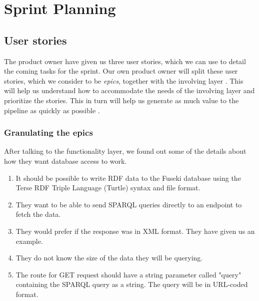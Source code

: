 \section{Sprint Planning}

\subsection{User stories}
The \knox{} product owner have given us three user stories, which we can use to detail the coming tasks for the sprint.
Our own product owner will split these user stories, which we consider to be \textit{epics}, together with the involving layer \cite{Epics}.
This will help us understand how to accommodate the needs of the involving layer and prioritize the stories.
This in turn will help us generate as much value to the pipeline as quickly as possible \cite{UserStories}.


\subsubsection*{Granulating the epics}
After talking to the functionality layer, we found out some of the details about how they want database access to work. 

\begin{enumerate}
    \item It should be possible to write RDF data to the Fuseki database using the Terse RDF Triple Language (Turtle) syntax and file format.
    \item They want to be able to send SPARQL queries directly to an endpoint to fetch the data.
    \item They would prefer if the response was in XML format. They have given us an example.
    \item They do not know the size of the data they will be querying.
    \item The route for GET request should have a string parameter called "query" containing the SPARQL query as a string.
    The query will be in URL-coded format.
\end{enumerate}

